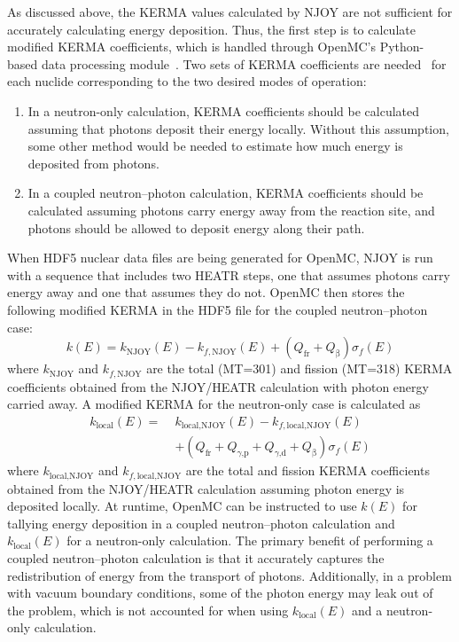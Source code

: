 \documentclass{anstrans}
\newcommand{\efr}{Q_\text{fr}}
\newcommand{\egp}{Q_\text{$\gamma$,p}}
\newcommand{\egd}{Q_\text{$\gamma$,d}}
\newcommand{\eb}{Q_\upbeta}
\begin{document}
As discussed above, the KERMA values calculated by NJOY are not sufficient for
accurately calculating energy deposition. Thus, the first step is to calculate
modified KERMA coefficients, which is handled through OpenMC's Python-based data
processing module~\cite{romano2017epjwoc}. Two sets of KERMA coefficients are
needed~\cite{trumbull2013mc} for each nuclide corresponding to the two desired
modes of operation:
\begin{enumerate}
    \item In a neutron-only calculation, KERMA coefficients should be calculated
    assuming that photons deposit their energy locally. Without this assumption,
    some other method would be needed to estimate how much energy is deposited
    from photons.
    \item In a coupled neutron--photon calculation, KERMA coefficients should be
    calculated assuming photons carry energy away from the reaction site, and
    photons should be allowed to deposit energy along their path.
\end{enumerate}
When HDF5 nuclear data files are being generated for OpenMC, NJOY is run with a
sequence that includes two HEATR steps, one that assumes photons carry energy
away and one that assumes they do not. OpenMC then stores the following modified
KERMA in the HDF5 file for the coupled neutron--photon case:
\begin{equation}
    \label{eq:k}
    k(E) = k_\text{NJOY}(E) - k_{f,\text{NJOY}}(E) + \left ( \efr +
        \eb \right ) \sigma_f(E)
\end{equation}
where $k_\text{NJOY}$ and $k_{f,\text{NJOY}}$ are the total (MT=301) and fission
(MT=318) KERMA coefficients obtained from the NJOY/HEATR calculation with photon
energy carried away. A modified KERMA for the neutron-only case is calculated as
\begin{equation}
    \label{eq:klocal}
    \begin{split}
    k_\text{local}(E) = \; &k_\text{local,NJOY}(E) - k_{f,\text{local,NJOY}}(E) \\
        &+ \left ( \efr + \egp + \egd + \eb \right )  \sigma_f(E)
    \end{split}
\end{equation}
where $k_\text{local,NJOY}$ and $k_{f,\text{local,NJOY}}$ are the total and
fission KERMA coefficients obtained from the NJOY/HEATR calculation assuming
photon energy is deposited locally. At runtime, OpenMC can be instructed to use
$k(E)$ for tallying energy deposition in a coupled neutron--photon calculation
and $k_\text{local}(E)$ for a neutron-only calculation. The primary benefit of
performing a coupled neutron--photon calculation is that it accurately captures
the redistribution of energy from the transport of photons. Additionally, in a
problem with vacuum boundary conditions, some of the photon energy may leak out
of the problem, which is not accounted for when using $k_\text{local}(E)$ and a
neutron-only calculation.
\end{document}
